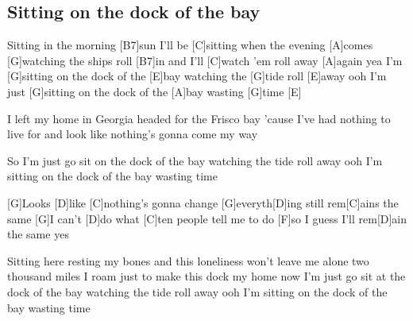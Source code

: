 \subsection*{Sitting on the dock of the bay   }
\begin{guitar}
[G]Sitting in the morning [B7]sun I'll be [C]sitting when the evening [A]comes
[G]watching the ships roll [B7]in and I'll [C]watch 'em roll away [A]again yea
I'm [G]sitting on the dock of the [E]bay watching the [G]tide roll [E]away ooh
I'm just [G]sitting on the dock of the [A]bay wasting [G]time [E] $\quad$

I left my home in Georgia headed for the Frisco bay
'cause I've had nothing to live for
and look like nothing's gonna come my way

So I'm just go sit on the dock of the bay watching the tide roll away ooh
I'm sitting on the dock of the bay wasting time

[G]Looks [D]like [C]nothing's gonna change [G]everyth[D]ing still rem[C]ains the same
[G]I can't [D]do what [C]ten people tell me to do [F]so I guess I'll rem[D]ain the same yes

Sitting here resting my bones and this loneliness won't leave me alone
two thousand miles I roam just to make this dock my home
now I'm just go sit at the dock of the bay watching the tide roll away ooh
I'm sitting on the dock of the bay wasting time
\end{guitar}
